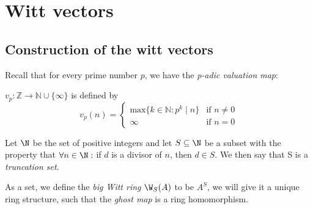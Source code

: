 \chapter{Witt vectors}
\section*{Construction of the witt vectors}

Recall that for every prime number $p$, we have the \textit{p-adic valuation map}:
\begin{definition}
   $v_p \colon \mathbb{Z} \to \mathbb{N} \cup\{\infty\}$
    is defined by 
    \[
        v_p(n)=
        \begin{cases}
        \mathrm{max}\{k \in \mathbb{N} : p^k \mid n\} & \text{if } n \neq 0\\
        \infty & \text{if } n=0
        \end{cases} 
    \]

\end{definition} 

\begin{definition}
    Let $\N$ be the set of positive integers and let $S\subseteq
    \N$ be a subset with the property that $\forall n\in \N:$
    if $d$ is a divisor of $n$, then $d\in S$.
    We then say that S is a \textit{truncation set}.
\end{definition}
As a set, we define the \textit{big Witt ring} $\W_S(A)$ to be $A^S$,
we will give it a unique ring structure, such that the \textit{ghost map}
is a ring homomorphism.

